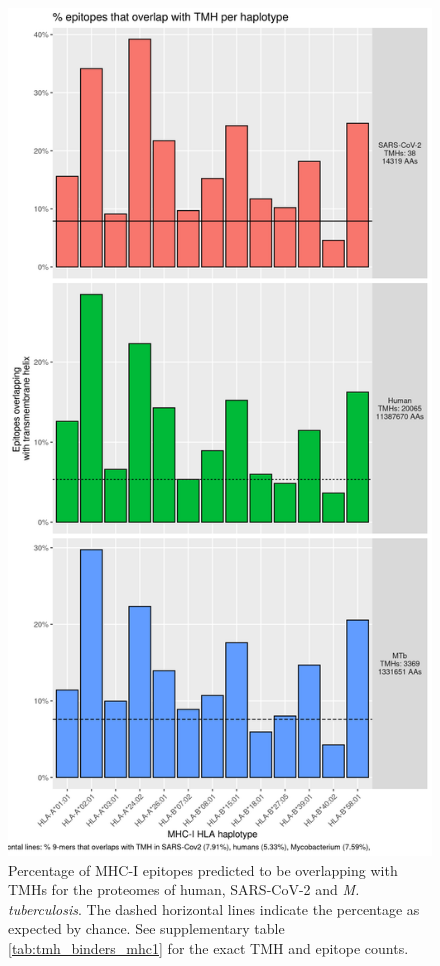 \begin{figure}[!htbp]
  \includegraphics[height=0.9\textheight]{bbbq_1_smart_results/fig_f_tmh_mhc1_2_grid.png}
  \caption{
    Percentage of MHC-I epitopes predicted to be overlapping with TMHs
    for the proteomes of human, SARS-CoV-2 and \emph{M. tuberculosis}.
    The dashed horizontal lines indicate the percentage as expected by chance.
    See supplementary table \ref{tab:tmh_binders_mhc1} for the exact TMH and epitope counts.
  }
  \label{fig:1}
\end{figure}

